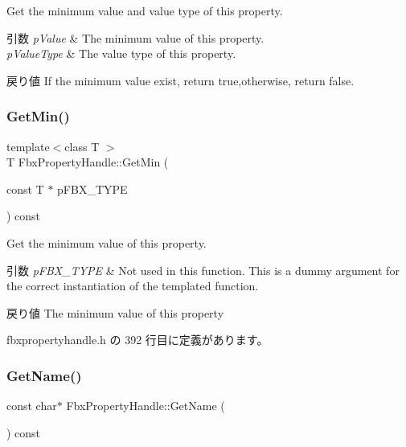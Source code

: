 Get the minimum value and value type of this property. 
\begin{DoxyParams}{引数}
{\em p\+Value} & The minimum value of this property. \\
\hline
{\em p\+Value\+Type} & The value type of this property. \\
\hline
\end{DoxyParams}
\begin{DoxyReturn}{戻り値}
If the minimum value exist, return true,otherwise, return false. 
\end{DoxyReturn}
\mbox{\label{class_fbx_property_handle_a82ce751c67e19e87294a0083f09133c6}} 
\subsubsection{\texorpdfstring{Get\+Min()}{GetMin()}\hspace{0.1cm}{\footnotesize\ttfamily [2/2]}}
{\footnotesize\ttfamily template$<$class T $>$ \\
T Fbx\+Property\+Handle\+::\+Get\+Min (\begin{DoxyParamCaption}\item[{const T $\ast$}]{p\+F\+B\+X\+\_\+\+T\+Y\+PE }\end{DoxyParamCaption}) const\hspace{0.3cm}{\ttfamily [inline]}}

Get the minimum value of this property. 
\begin{DoxyParams}{引数}
{\em p\+F\+B\+X\+\_\+\+T\+Y\+PE} & Not used in this function. This is a dummy argument for the correct instantiation of the templated function. \\
\hline
\end{DoxyParams}
\begin{DoxyReturn}{戻り値}
The minimum value of this property 
\end{DoxyReturn}


 fbxpropertyhandle.\+h の 392 行目に定義があります。

\mbox{\label{class_fbx_property_handle_a38a846122c8564c62fb58426235b12e6}} 
\subsubsection{\texorpdfstring{Get\+Name()}{GetName()}}
{\footnotesize\ttfamily const char$\ast$ Fbx\+Property\+Handle\+::\+Get\+Name (\begin{DoxyParamCaption}{ }\end{DoxyParamCaption}) const}



